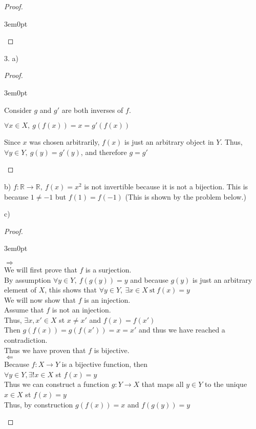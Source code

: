 \documentclass[11pt]{article}
\newcommand{\bproof}{\begin{proof}
$ $ \\
\begin{adjustwidth}{3em}{0pt}
}
\newcommand{\eproof}{\end{adjustwidth}
\end{proof}}
\begin{document}
\begin{flushleft}
\bproof



\eproof

3. a)
\bproof

Consider $ g $ and $ g' $ are both inverses of $f$. \\
\begin{center}
 $\forall x \in X, \ g(f(x)) = x = g'(f(x))$ \\
\end{center}
Since $x$ was chosen arbitrarily, $f(x)$ is just an arbitrary object in $Y$. 
Thus, $ \forall y \in Y, \  g(y) = g'(y)$, and therefore $g = g'$

\eproof

b) $f:\mathbb{R} \rightarrow \mathbb{R}, \ f(x) = x^2$ is not invertible because it is not a bijection. This is because $1 \neq -1$ but $f(1) = f(-1)$ (This is shown by the problem below.)

\bigskip

c) 
\bproof
$\Rightarrow$ \\
We will first prove that $f$ is a surjection. \\
By assumption $\forall y \in Y, \ f(g(y)) = y$ and because $g(y)$ is just an arbitrary element of $X$, this shows that $\forall y \in Y, \ \exists x \in X \ \text{st} \ f(x) = y$ \newline
\\
We will now show that $f$ is an injection. \\
Assume that $f$ is not an injection. \\
Thus, $\exists x, x' \in X$ st $x \neq x'$ and $f(x) = f(x')$ \\
Then $g(f(x)) = g(f(x')) = x = x'$ and thus we have reached a contradiction. \newline
\\
Thus we have proven that $f$ is bijective. \newline
\\
$\Leftarrow$ \\
Because $f:X \rightarrow Y$ is a bijective function, then \\
$\forall y \in Y, \exists ! x \in X$ st $f(x) = y$ \\
Thus we can construct a function $g: Y \rightarrow X$ that maps all $y \in Y$ to the unique $x \in X$ st $f(x) = y$ \\
Thus, by construction $g(f(x)) = x$ and $f(g(y)) = y$

\eproof

\bigskip


\end{flushleft}
\end{document}
